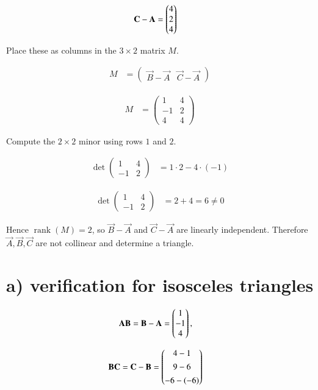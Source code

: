\documentclass[journal]{IEEEtran}
\begin{document}
\begin{align}
\mathbf{C}-\mathbf{A} &= \begin{pmatrix}4\\2\\4\end{pmatrix}
\end{align}

Place these as columns in the $3\times 2$ matrix $M$.

\begin{align}
M &= \begin{pmatrix} \vec{B}-\vec{A} & \vec{C}-\vec{A} \end{pmatrix}
\end{align}

\begin{align}
M &= \begin{pmatrix}
1 & 4\\[4pt]
-1 & 2\\[4pt]
4 & 4
\end{pmatrix}
\end{align}

Compute the $2\times2$ minor using rows $1$ and $2$.

\begin{align}
\det\begin{pmatrix}1 & 4\\[4pt] -1 & 2\end{pmatrix}
&= 1\cdot 2 - 4\cdot(-1)
\end{align}

\begin{align}
\det\begin{pmatrix}1 & 4\\[4pt] -1 & 2\end{pmatrix}
&= 2 + 4 = 6 \neq 0
\end{align}

Hence $\operatorname{rank}(M)=2$, so $\vec{B}-\vec{A}$ and $\vec{C}-\vec{A}$ are linearly independent.  
Therefore $\vec{A},\vec{B},\vec{C}$ are not collinear and determine a triangle.

\section*{a) verification for isosceles triangles}
\begin{align}
\mathbf{AB} &= \mathbf{B}-\mathbf{A} = \begin{pmatrix}1\\-1\\4\end{pmatrix},
\end{align}

\begin{align}
\mathbf{BC} &= \mathbf{C}-\mathbf{B} = \begin{pmatrix}4-1\\[4pt]9-6\\[4pt]-6-(-6)\end{pmatrix}
\end{align}
\end{document}
